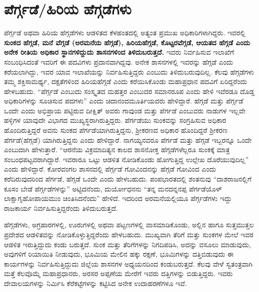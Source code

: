 \section*{ಪೆರ್ಗ್ಗಡೆ/ಹಿರಿಯ ಹೆಗ್ಗಡೆಗಳು}

ಪೆರ್ಗ್ಗಡೆ ಅಥವಾ ಹಿರಿಯ ಹೆಗ್ಗಡೆಗಳು ಆಡಳಿತದ ಕೆಳಹಂತದಲ್ಲಿ ಅತ್ಯಂತ ಪ್ರಮುಖ ಅಧಿಕಾರಿಗಳಾಗಿದ್ದರು. ಇವರಲ್ಲಿ \textbf{ಸುಂಕದ ಹೆಗ್ಗಡೆ, ಮನೆ ವೆಗ್ಗಡೆ (ಅರಮನೆಯ ಹೆಗ್ಗಡೆ), ಹಿರಿಯಹೆಗ್ಗಡೆ, ಕೊಟ್ಟರವೆಗ್ಗಡೆ, ಆಯತದ ಹೆಗ್ಗಡೆ ಎಂದು ಅನೇಕ ರೀತಿಯ ಅಧಿಕಾರ ಸ್ಥಾನಗಳಿದ್ದುದು ಶಾಸನಗಳಿಂದ ತಿಳಿದುಬರುತ್ತದೆ. } ಇವರು ನಿರ್ವಹಿಸುವ ಇಲಾಖೆಗೆ ಸಂಬಂಧಿಸಿದಂತೆ ಇವರಿಗೆ ಈ ಪದವಿಗಳು ಪ್ರದಾನವಾಗಿದ್ದವು. ಅನೇಕ ಶಾಸನಗಳಲ್ಲಿ ಇವರನ್ನು ಹೆಗ್ಗಡೆ ಎಂದು ಕರೆಯಲಾಗಿದ್ದು, ಇವರ ಯಾವ ಇಲಾಖೆಯನ್ನು ನಿರ್ವಹಿಸುತ್ತಿದ್ದರು ಎಂಬುದು ತಿಳಿದುಬರುವುದಿಲ್ಲ. ಕೆಲವು ಹೆಗ್ಗಡೆಗಳು ತಮ್ಮ ಶಕ್ತಿಸಾಮರ್ಥ್ಯ, ದಕ್ಷತೆಗಳಿಂದ ಹಿರಿಯಹೆಗ್ಗಡೆ ಎಂದು ಕರೆಯಿಸಿಕೊಂಡು ಮಹಾಪ್ರಧಾನ ಪದವಿಗೆ ಏರಿದ್ದರೆಂದು ಹೇಳಬಹುದು. “ಪೆರ್ಗ್ಗಡೆ ಎಂಬುದು ಸಂಸ್ಕೃತದ ಮಹತ್ತರ ಎಂಬುದರ ಸಮಾನರೂಪ ಎಂದು ಹೇಳಿ ಇವೆರಡೂ ದೊಡ್ಡ ಅಧಿಕಾರಿಗಳನ್ನು ಸೂಚಿಸುವ ಪದಗಳು” ಎಂದು ಚಿದಾನಂದಮೂರ್ತಿಯವರು ಹೇಳಿದ್ದಾರೆ. ಹೆಗ್ಗಡೆ ಮತ್ತು ಪೆರ್ಗ್ಗಡೆ ಒಂದೇ ಎಂದು ಅಭಿಪ್ರಾಯ ಪಟ್ಟಿರುವ ದೀಕ್ಷಿತ್​ ಅವರು ಗಾವುಂಡ ಮತ್ತು ಪೆರ್ಗಡೆ ಎಂಬುವರು ನಾಡುಗಳ ಇಲ್ಲವೇ ಹಳ್ಳಿಗಳ ಯಾವುದೇ ವಿಭಾಗದ ಮುಖ್ಯಸ್ಥರಾಗಿರುತ್ತಿದ್ದರು. ಪೆರ್ಗಡೆಯು ಸುಂಕವನ್ನು ಸಂಗ್ರಹಿಸುವ ಅಧಿಕಾರ ಹೊಂದಿರುತ್ತಿದ್ದರೆ ಅವನು ಸುಂಕದ ಪೆರ್ಗಡೆಯಾಗಿರುತ್ತಿದ್ದನು, ಶ‍್ರೀಕರಣದ ಅಧಿಕಾರ ಹೊಂದಿದ್ದರೆ ಶ‍್ರೀಕರಣ ಪೆರ್ಗಡೆ(ಹೆಗ್ಗಡೆ) ಯಾಗಿರುತ್ತಿದ್ದನು ಎಂದು ಹೇಳಿದ್ದಾರೆ. ನಾಗಯ್ಯನವರೂ ಪೆರ್ಗಡೆ ಮತ್ತು ಹೆಗ್ಗಡೆ ಇಬ್ಬರನ್ನೂ ಒಂದೇ ಎಂಬುದಾಗಿ ಹೇಳುತ್ತಾರೆ. “ಆರನೆಯ ವಿಕ್ರಮಾದಿತ್ಯನ ಕಾಲದ ಶಾಸನೋಕ್ತ ಹೆಗ್ಗಡೆಗಳೆಲ್ಲರೂ ಸುಂಕಕ್ಕೆ ಮಾತ್ರ ಸಂಬಂಧಪಟ್ಟವರಾಗಿದ್ದಾರೆ. ಇವರಾರೂ ಒಟ್ಟು ಆಡಳಿತ ನೋಡಿಕೊಂಡು ಹೋಗುತ್ತಿದ್ದ ಉಲ್ಲೇಖ ದೊರೆಯುವುದಿಲ್ಲ” ಎಂದು ಹೇಳಿದ್ದಾರೆ. ಕೋರವಂಗಲ ಶಾಸನದಲ್ಲಿ ಪೆರ್ಗ್ಗಡೆ ಗೋವಿಂದನನ್ನು ಹೆಗ್ಗಡೆ ಗೋವಿಂದ ಎಂದು ಕರೆದಿರುವುದರಿಂದ ಪೆರ್ಗಡೆ, ಹೆಗ್ಗಡೆ ಒಂದೇ ಎಂದು ಹೇಳಬಹುದು. ಪಂಪಭಾರತದಲ್ಲಿ ಶಂತನುವು “ದಾಶರಾಜನಲ್ಲಿಗೆ ಕೂಸಂ ಬೇಡೆ ಪೆರ್ಗ್ಗಡೆಗಳನ್ನು” ಅಟ್ಟಿದನೆಂದು, ದುರ್ಯೋಧನನು “ತನ್ನ ಮನದನ್ನನಪ್ಪ ಪೆರ್ಗಡೆಯೊಳ್​ ಲಾಕ್ಷಾಗೃಹೋಪಾಯಮುಂ ಚಿಂತಿಸಿದನೆಂದು” ಹೇಳಿದೆ. ಇದರಿಂದ ಅರಮನೆಯಲ್ಲಿಯೂ ಪೆರ್ಗ್ಗಡೆಗಳು ಇದ್ದು ರಾಜಕಾರ್ಯ ನಿರ್ವಹಿಸುತ್ತಿದ್ದರೆಂದು ತಿಳಿದುಬರುತ್ತದೆ.

ಹೆಗ್ಗಡೆಗಳು, ಅಗ್ರಹಾರಗಳಲ್ಲಿ, ಊರುಗಳಲ್ಲಿ ಅಥವಾ ಪಟ್ಟಣಗಳಲ್ಲಿ ವಾಸಮಾಡಿಕೊಂಡು, ಅಲ್ಲಿನ ಹಾಗೂ ಸುತ್ತಮುತ್ತಲ ಪ್ರದೇಶದ ಆಡಳಿತವನ್ನು ನೋಡಿಕೊಳ್ಳುತ್ತಿದ್ದರೆಂದು ಹೇಳಬಹುದು. ಮುಖ್ಯವಾಗಿ ತೆರಿಗೆ ಮತ್ತು ಸುಂಕಗಳ ಮೇಲೆ ಇವರ ಆಡಳಿತ ಇರುತ್ತಿದ್ದುದು ಕಂಡು ಬರುತ್ತದೆ. ಸುಂಕ ಮತ್ತು ತೆರಿಗೆಗಳನ್ನು ನಿಗದಿಪಡಿಸಿ, ಅದನ್ನು ವಸೂಲು ಮಾಡುವುದು, ಅವುಗಳಿಗೆ ರಿಯಾಯಿತಿ ನೀಡುವುದು, ಭೂಮಿಯ ಮೇಲಿನ ಹಕ್ಕು ರಕ್ಷಣೆ, ಭೂಮಿಗಳನ್ನು ದತ್ತಿಬಿಡುವುದು ಈ ಕಾರ್ಯಗಳನ್ನು ನಿರ್ವಹಿಸುತ್ತಿದ್ದುದು ಜಿಲ್ಲೆಯ ಶಾಸನಗಳ ಅಧ್ಯಯನದಿಂದ ಕಂಡುಬರುತ್ತದೆ. ಕೆಲವು ವೇಳೆ ಸ್ವತಂತ್ರವಾಗಿ ಮತ್ತೆ ಕೆಲವೊಮ್ಮೆ ಮಹಾಪ್ರಧಾನರು, ಅರಸರ ಅಪ್ಪಣೆಯ ಮೇರೆಗೆ ಇವರು ದತ್ತಿಗಳನ್ನು ಬಿಡುತ್ತಿದ್ದರು. ಇವರು ದೇವಾಲಯಗಳನ್ನು ನಿರ್ಮಿಸಿ ಕೆರೆಕಟ್ಟೆಗಳನ್ನು ಕಟ್ಟಿಸಿದ ಅನೇಕ ಉದಾಹರಣೆಗಳೂ ಇವೆ.

